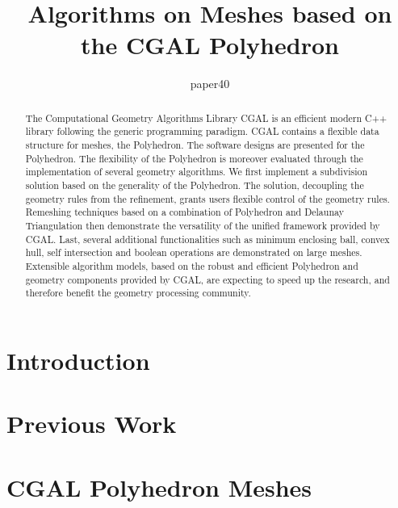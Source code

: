 \documentclass{egpubl}
\title{Algorithms on Meshes based on the CGAL Polyhedron}
\author[paper40]{paper40}
\begin{document}
\maketitle

\begin{abstract}


The Computational Geometry Algorithms Library CGAL is an efficient
modern C++ library following the generic programming paradigm. CGAL
contains a flexible data structure for meshes, the
Polyhedron. The software designs are presented for the Polyhedron. 
The flexibility of the Polyhedron is moreover evaluated
through the implementation of several geometry algorithms.  We first
implement a subdivision solution based on the generality of the
Polyhedron. The solution, decoupling the geometry rules from the
refinement, grants users flexible control of the geometry rules.
Remeshing techniques based on a combination of Polyhedron and Delaunay
Triangulation then demonstrate the versatility of the unified
framework provided by CGAL.  Last, several additional functionalities
such as minimum enclosing ball, convex hull, self intersection and
boolean operations are demonstrated on large meshes.  Extensible
algorithm models, based on the robust and efficient Polyhedron and
geometry components provided by CGAL, are expecting to speed up the
research, and therefore benefit the geometry processing community.

\begin{classification} %
\end{classification}

\end{abstract}


\section{Introduction}


\section{Previous Work}
 

\section{CGAL Polyhedron Meshes}
 
\end{document}

